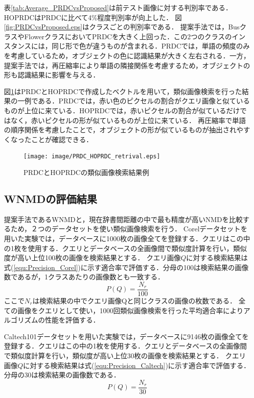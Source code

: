 表\ref{tab:Average_PRDCvsProposed}は前テスト画像に対する判別率である．HOPRDCはPRDCに比べて4\%程度判別率が向上した．
図\ref{fig:PRDCvsProposed.eps}はクラスごとの判別率である．
提案手法では，BusクラスやFlowerクラスにおいてPRDCを大きく上回った．この2つのクラスのインスタンスには，同じ形で色が違うものが含まれる．PRDCでは，単語の頻度のみを考慮しているため，オブジェクトの色に認識結果が大きく左右される．一方，提案手法では，再圧縮率により単語の隣接関係を考慮するため，オブジェクトの形も認識結果に影響を与える．

図\ref{fig:PRDC_HOPRDC_retrival.eps}はPRDCとHOPRDCで作成したベクトルを用いて，類似画像検索を行った結果の一例である．PRDCでは，赤い色のピクセルの割合がクエリ画像と似ているものが上位に来ている．HOPRDCでは，赤いピクセルの割合が似ているだけではなく，赤いピクセルの形が似ているものが上位に来ている．
再圧縮率で単語の順序関係を考慮したことで，オブジェクトの形が似ているものが抽出されやすくなったことが確認できる．

\begin{figure}[tb]
\centering
\texttt{[image: image/PRDC\_HOPRDC\_retrival.eps]}
\caption{PRDCとHOPRDCの類似画像検索結果例}
\label{fig:PRDC_HOPRDC_retrival.eps}
\end{figure}


\subsection{WNMDの評価結果}
提案手法であるWNMDと，現在辞書間距離の中で最も精度が高いNMDを比較するため，２つのデータセットを使い類似画像検索を行う．
Corelデータセットを用いた実験では，データベースに1000枚の画像全てを登録する．クエリはこの中の1枚を使用する．クエリとデータベースの全画像間で類似度計算を行い，類似度が高い上位100枚の画像を検索結果とする．
クエリ画像$Q$に対する検索結果は式(\ref{equ:Precision_Corel})に示す適合率で評価する．分母の100は検索結果の画像数であるが，1クラスあたりの画像数とも一致する．
\begin{equation}
P(Q) = \frac{N_r}{100}
\label{equ:Precision_Corel}
\end{equation}
ここで$N_r$は検索結果の中でクエリ画像Qと同じクラスの画像の枚数である．
全ての画像をクエリとして使い，1000回類似画像検索を行った平均適合率によりアルゴリズムの性能を評価する．

Caltech101データセットを用いた実験では，データベースに9146枚の画像全てを登録する．クエリはこの中の1枚を使用する．クエリとデータベースの全画像間で類似度計算を行い，類似度が高い上位30枚の画像を検索結果とする．
クエリ画像$Q$に対する検索結果は式(\ref{equ:Precision_Caltech})に示す適合率で評価する．分母の30は検索結果の画像数である．
\begin{equation}
P(Q) = \frac{N_r}{30}
\label{equ:Precision_Caltech}
\end{equation}

